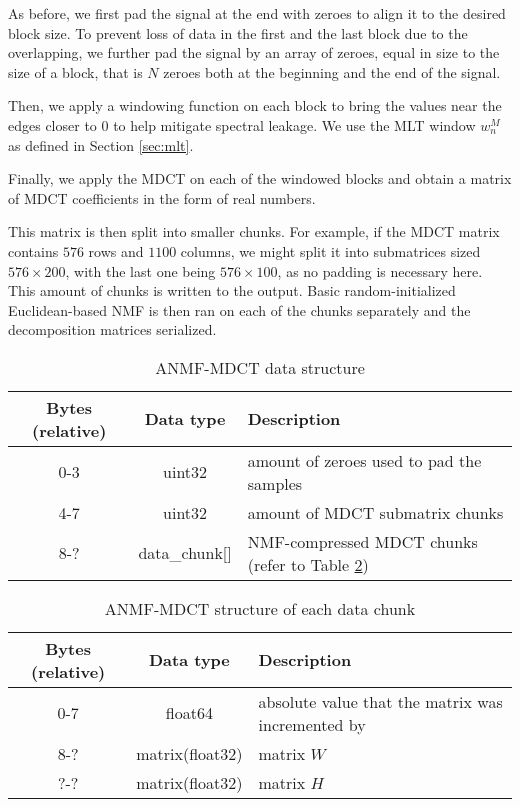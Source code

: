 As before, we first pad the signal at the end with zeroes to align it to the desired block size. To prevent loss of data in the first and the last block due to the overlapping, we further pad the signal by an array of zeroes, equal in size to the size of a block, that is $N$ zeroes both at the beginning and the end of the signal.

Then, we apply a windowing function on each block to bring the values near the edges closer to $0$ to help mitigate spectral leakage. We use the MLT window $w_n^M$ as defined in Section \ref{sec:mlt}.

Finally, we apply the MDCT on each of the windowed blocks and obtain a matrix of MDCT coefficients in the form of real numbers.

This matrix is then split into smaller chunks. For example, if the MDCT matrix contains $576$ rows and $1100$ columns, we might split it into submatrices sized $576 \times 200$, with the last one being $576 \times 100$, as no padding is necessary here. This amount of chunks is written to the output. Basic random-initialized Euclidean-based NMF is then ran on each of the chunks separately and the decomposition matrices serialized.

\begin{table}[htbp]\caption{ANMF-MDCT data structure}
	\label{tab:anmf_mdct_file}
	\centering
	\begin{tabular}{|c|c|l|}
		\hline
		Bytes (relative) & Data type & Description \\ \hline
		0-3 & uint32 & amount of zeroes used to pad the samples \\
		4-7 & uint32 & amount of MDCT submatrix chunks \\
		8-? & data\_chunk[] & NMF-compressed MDCT chunks (refer to Table \ref{tab:anmf_mdct_data}) \\
		\hline
	\end{tabular}
\end{table}

\begin{table}[htbp]\caption{ANMF-MDCT structure of each data chunk}
	\label{tab:anmf_mdct_data}
	\centering
	\begin{tabular}{|c|c|l|}
		\hline
		Bytes (relative) & Data type & Description \\ \hline
		0-7 & float64 & absolute value that the matrix was incremented by \\
		8-? & matrix(float32) & matrix $W$ \\
		?-? & matrix(float32) & matrix $H$ \\
		\hline
	\end{tabular}
\end{table}

